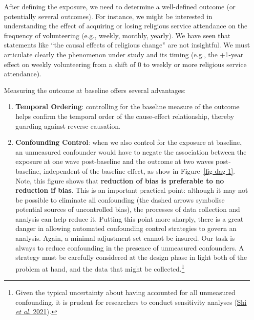 \documentclass[
  singlecolumn]{article}
\begin{document}
After defining the exposure, we need to determine a well-defined outcome
(or potentially several outcomes). For instance, we might be interested
in understanding the effect of acquiring or losing religious service
attendance on the frequency of volunteering (e.g., weekly, monthly,
yearly). We have seen that statements like ``the causal effects of
religious change'' are not insightful. We must articulate clearly the
phenomenon under study and its timing (e.g., the +1-year effect on
weekly volunteering from a shift of 0 to weekly or more religious
service attendance).

Measuring the outcome at baseline offers several advantages:

\begin{enumerate}
\def\labelenumi{\alph{enumi}.}
\item
  \textbf{Temporal Ordering}: controlling for the baseline measure of
  the outcome helps confirm the temporal order of the cause-effect
  relationship, thereby guarding against reverse causation.
\item
  \textbf{Confounding Control}: when we also control for the exposure at
  baseline, an unmeasured confounder would have to negate the
  association between the exposure at one wave post-baseline and the
  outcome at two waves post-baseline, independent of the baseline
  effect, as show in Figure~\ref{fig-dag-1}. Note, this figure shows
  that \textbf{reduction of bias is preferable to no reduction if bias}.
  This is an important practical point: although it may not be possible
  to eliminate all confounding (the dashed arrows symbolise potential
  sources of uncontrolled bias), the processes of data collection and
  analysis can help reduce it. Putting this point more sharply, there is
  a great danger in allowing automated confounding control strategies to
  govern an analysis. Again, a minimal adjustment set cannot be insured.
  Our task is always to reduce confounding in the presence of unmeasured
  confounders. A strategy must be carefully considered at the design
  phase in light both of the problem at hand, and the data that might be
  collected.\footnote{Given the typical uncertainty about having
    accounted for all unmeasured confounding, it is prudent for
    researchers to conduct sensitivity analyses
    (\protect\hyperlink{ref-shi2021}{Shi \emph{et al.} 2021}).}
\end{enumerate}
\end{document}
